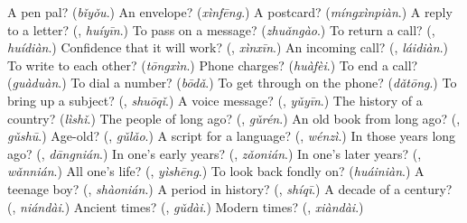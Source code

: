 \begin{tcolorbox}[breakable,colback=teal!4,colframe=teal!35!black,title={Before you move on}]
A pen pal? (\emph{bǐyǒu}.) An envelope? (\emph{xìnfēng}.) A postcard? (\emph{míngxìnpiàn}.) A reply to a letter? (\textbf{}, \emph{huíyīn}.) To pass on a message? (\emph{zhuǎngào}.) To return a call? (\textbf{}, \emph{huídiàn}.) Confidence that it will work? (\textbf{}, \emph{xìnxīn}.) An incoming call? (\textbf{}, \emph{láidiàn}.) To write to each other? (\emph{tōngxìn}.) Phone charges? (\emph{huàfèi}.) To end a call? (\emph{guàduàn}.) To dial a number? (\emph{bōdǎ}.) To get through on the phone? (\emph{dǎtōng}.) To bring up a subject? (\textbf{}, \emph{shuōqǐ}.) A voice message? (\textbf{}, \emph{yǔyīn}.) The history of a country? (\emph{lìshǐ}.) The people of long ago? (\textbf{}, \emph{gǔrén}.) An old book from long ago? (\textbf{}, \emph{gǔshū}.) Age-old? (\textbf{}, \emph{gǔlǎo}.) A script for a language? (\textbf{}, \emph{wénzì}.) In those years long ago? (\textbf{}, \emph{dāngnián}.) In one's early years? (\textbf{}, \emph{zǎonián}.) In one's later years? (\textbf{}, \emph{wǎnnián}.) All one's life? (\textbf{}, \emph{yìshēng}.) To look back fondly on? (\emph{huáiniàn}.) A teenage boy? (\textbf{}, \emph{shàonián}.) A period in history? (\textbf{}, \emph{shíqī}.) A decade of a century? (\textbf{}, \emph{niándài}.) Ancient times? (\textbf{}, \emph{gǔdài}.) Modern times? (\textbf{}, \emph{xiàndài}.)
\end{tcolorbox}
